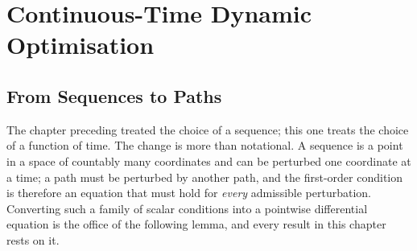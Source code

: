 
\chapter{Continuous-Time Dynamic Optimisation}
\label{ch:continuoustime}

\section{From Sequences to Paths}\label{sec:ct-motivation}

The chapter preceding treated the choice of a sequence; this one treats the choice
of a function of time. The change is more than notational. A sequence is a point
in a space of countably many coordinates and can be perturbed one coordinate at a
time; a path must be perturbed by another path, and the first-order condition is
therefore an equation that must hold for \emph{every} admissible perturbation.
Converting such a family of scalar conditions into a pointwise differential
equation is the office of the following lemma, and every result in this chapter
rests on it.

